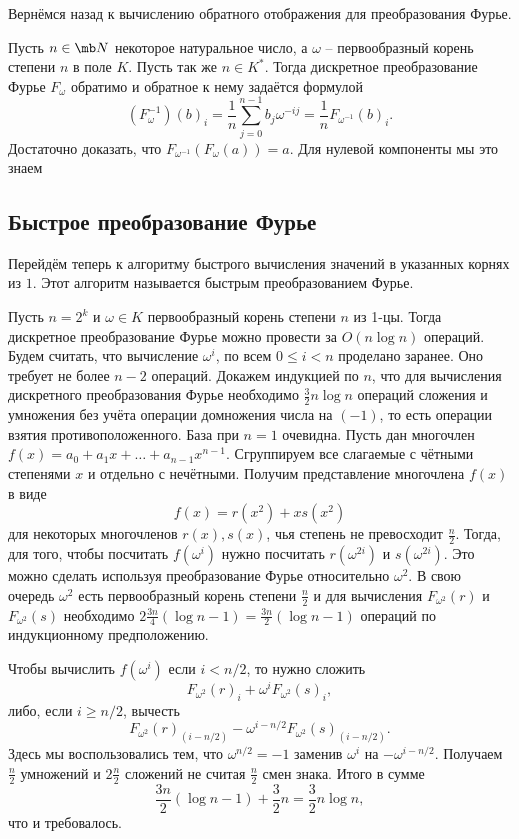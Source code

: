 Вернёмся назад к вычислению обратного отображения для преобразования Фурье.

 Пусть $n\in \mb N$ некоторое натуральное число, а $\omega$ -- первообразный корень степени $n$ в поле $K$. Пусть так же $n \in K^*$. Тогда дискретное преобразование Фурье  $F_{\omega}$ обратимо и обратное к нему задаётся формулой $$(F_{\omega}^{-1})(b)_i=\frac{1}{n}\sum_{j=0}^{n-1} b_j \omega^{-ij}=\frac{1}{n} F_{\omega^{-1}}(b)_i.$$
\ethrm
\proof Достаточно доказать, что $F_{\omega^{-1}}(F_{\omega}(a))=a$. Для нулевой компоненты мы это знаем


\endproof

\subsection{Быстрое преобразование Фурье}

Перейдём теперь к алгоритму быстрого вычисления значений в указанных корнях из $1$. Этот алгоритм называется быстрым преобразованием Фурье.

 Пусть $n=2^k$ и $\omega \in K$ первообразный корень степени $n$ из 1-цы. Тогда дискретное преобразование Фурье можно провести за $O(n\log n)$ операций.
\ethrm
\proof  Будем считать, что вычисление $\omega^i$, по всем $0\leq i<n$ проделано заранее. Оно требует не более $n-2$ операций. Докажем индукцией по $n$, что для вычисления дискретного преобразования Фурье необходимо $\frac{3}{2} n\log n$ операций сложения и умножения без учёта операции домножения числа на $(-1)$, то есть операции взятия противоположенного. База при $n=1$ очевидна. Пусть дан многочлен $f(x)=a_0+a_1x+\dots+a_{n-1}x^{n-1}$. Сгруппируем все слагаемые с чётными степенями $x$  и отдельно с нечётными. Получим представление многочлена $f(x)$ в виде 
$$f(x)=r(x^2)+xs(x^2)$$
для некоторых многочленов $r(x), s(x)$, чья степень не превосходит $\frac{n}{2}$. Тогда, для того, чтобы посчитать $f(\omega^i)$ нужно посчитать $r(\omega^{2i})$ и $s(\omega^{2i})$. Это можно сделать используя преобразование Фурье относительно $\omega^2$. В свою очередь $\omega^2$ есть первообразный корень степени $\frac{n}{2}$ и для вычисления $F_{\omega^2}(r)$ и $F_{\omega^2}(s)$ необходимо $2\frac{3n}{4}(\log n -1)=\frac{3n}{2}(\log n -1)$ операций по индукционному предположению.

Чтобы вычислить $f(\omega^i)$  если $i<n/2$, то нужно сложить   $$F_{\omega^2}(r)_i+\omega^{i}F_{\omega^2}(s)_i,$$ либо, если $i\geq n/2$,  вычесть 
$$F_{\omega^2}(r)_{(i-n/2)}-\omega^{i-n/2}F_{\omega^2}(s)_{(i-n/2)}.$$
Здесь мы воспользовались тем, что $\omega^{n/2}=-1$ заменив $\omega^i$ на $-\omega^{i-n/2}$. 
Получаем $\frac{n}{2}$ умножений и $2\frac{n}{2}$ сложений не считая $\frac{n}{2}$ смен знака. Итого в сумме 
$$\frac{3n}{2}(\log n -1) +\frac{3}{2}n=\frac{3}{2}n\log n,$$
что и требовалось.
\endproof


